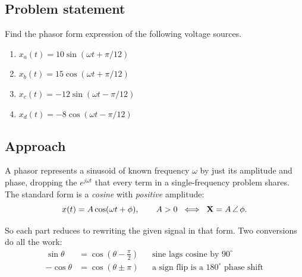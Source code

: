 





\subsection*{Problem statement}

Find the phasor form expression of the following voltage sources.
\begin{enumerate}
  \item $x_a(t) = 10\sin(\omega t + \pi/12)$
  \item $x_b(t) = 15\cos(\omega t + \pi/12)$
  \item $x_c(t) = -12\sin(\omega t - \pi/12)$
  \item $x_d(t) = -8\cos(\omega t - \pi/12)$
\end{enumerate}

\subsection*{Approach}

A phasor represents a sinusoid of known frequency $\omega$ by just its
amplitude and phase, dropping the $e^{j\omega t}$ that every term in a
single-frequency problem shares. The standard form is a \emph{cosine} with
\emph{positive} amplitude:
\begin{equation}
  x(t) = A\cos(\omega t + \phi), \qquad A > 0
  \;\;\Longleftrightarrow\;\;
  \mathbf{X} = A\,\angle\,\mathord{\phi}.
  \label{eq:phasor-def}
\end{equation}

So each part reduces to rewriting the given signal in that form. Two
conversions do all the work:
\begin{align}
  \sin\theta &= \cos\!\left(\theta - \tfrac{\pi}{2}\right)
    && \text{sine lags cosine by } 90^\circ \label{eq:sin2cos}\\
  -\cos\theta &= \cos(\theta \pm \pi)
    && \text{a sign flip is a } 180^\circ \text{ phase shift} \label{eq:negcos}
\end{align}

